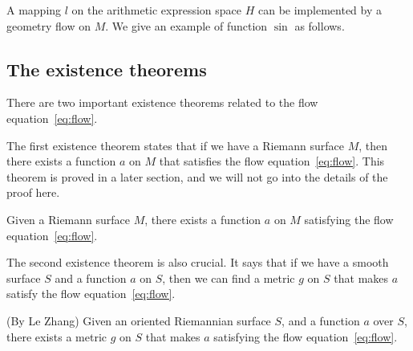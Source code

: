 A mapping $l$ on the arithmetic expression space $H$ can be implemented by a geometry flow on $M$.
We give an example of function $\sin$ as follows.

\subsection{The existence theorems}\label{subsec:existence-theorems}

There are two important existence theorems related to the flow equation~\eqref{eq:flow}.

The first existence theorem states that if we have a Riemann surface $M$, then there exists a function $a$ on $M$ that satisfies the flow equation~\eqref{eq:flow}. This theorem is proved in a later section, and we will not go into the details of the proof here.

\begin{theorem}
    Given a Riemann surface $M$, there exists a function $a$ on $M$ satisfying the flow equation~\eqref{eq:flow}.
    \label{prop:existence1st}
\end{theorem}

The second existence theorem is also crucial.
It says that if we have a smooth surface $S$ and a function $a$ on $S$, then we can find a metric $g$ on $S$ that makes $a$ satisfy the flow equation~\eqref{eq:flow}.

\begin{theorem}(By Le Zhang)
    Given an oriented Riemannian surface $S$, and a function $a$ over $S$, there exists a metric $g$ on $S$ that makes $a$
    satisfying the flow equation~\eqref{eq:flow}.
    \label{prop:existence2nd}
\end{theorem}

